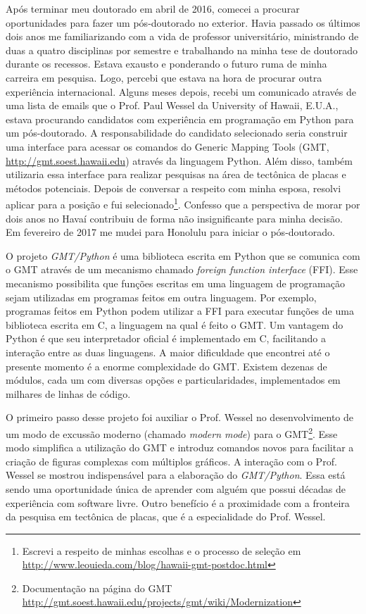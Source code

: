 Após terminar meu doutorado em abril de 2016, comecei a procurar oportunidades
para fazer um pós-doutorado no exterior.
Havia passado os últimos dois anos me familiarizando com a vida de professor
universitário, ministrando de duas a quatro disciplinas por semestre e
trabalhando na minha tese de doutorado durante os recessos.
Estava exausto e ponderando o futuro ruma de minha carreira em pesquisa.
Logo, percebi que estava na hora de procurar outra experiência internacional.
Alguns meses depois, recebi um comunicado através de uma lista de emails que o
Prof. Paul Wessel da University of Hawaii, E.U.A., estava procurando candidatos
com experiência em programação em Python para um pós-doutorado.
A responsabilidade do candidato selecionado seria construir uma interface
para acessar os comandos do Generic Mapping Tools (GMT,
\url{http://gmt.soest.hawaii.edu}) através da linguagem Python.
Além disso, também utilizaria essa interface para realizar pesquisas na área de
tectônica de placas e métodos potenciais.
Depois de conversar a respeito com minha esposa, resolvi aplicar para a
posição e fui selecionado\footnote{Escrevi a respeito de minhas escolhas e o
processo de seleção em
\url{http://www.leouieda.com/blog/hawaii-gmt-postdoc.html}}.
Confesso que a perspectiva de morar por dois anos no Havaí contribuiu
de forma não insignificante para minha decisão.
Em fevereiro de 2017 me mudei para Honolulu para iniciar o pós-doutorado.

O projeto \textit{GMT/Python} é uma biblioteca escrita em Python que se
comunica com o GMT através de um mecanismo chamado \textit{foreign function
interface} (FFI).
Esse mecanismo possibilita que funções escritas em uma linguagem de programação
sejam utilizadas em programas feitos em outra linguagem.
Por exemplo, programas feitos em Python podem utilizar a FFI para executar
funções de uma biblioteca escrita em C, a linguagem na qual é feito o GMT.
Um vantagem do Python é que seu interpretador oficial é implementado em C,
facilitando a interação entre as duas linguagens.
A maior dificuldade que encontrei até o presente momento é a enorme
complexidade do GMT.
Existem dezenas de módulos, cada um com diversas opções e particularidades,
implementados em milhares de linhas de código.

O primeiro passo desse projeto foi auxiliar o Prof. Wessel no desenvolvimento
de um modo de excussão moderno (chamado \textit{modern mode}) para o
GMT\footnote{Documentação na página do GMT
\url{http://gmt.soest.hawaii.edu/projects/gmt/wiki/Modernization}}.
Esse modo simplifica a utilização do GMT e introduz comandos novos para
facilitar a criação de figuras complexas com múltiplos gráficos.
A interação com o Prof. Wessel se mostrou indispensável para a elaboração do
\textit{GMT/Python}.
Essa está sendo uma oportunidade única de aprender com alguém que possui
décadas de experiência com software livre.
Outro benefício é a proximidade com a fronteira da pesquisa em tectônica de
placas, que é a especialidade do Prof. Wessel.

